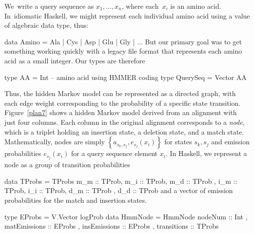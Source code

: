 \documentclass[preprint,nonatbib,blockstyle,nocopyrightspace,times]{sigplanconf}
\newcommand\figref[1]{Figure~\ref{#1}}
\newenvironment{smallverbatim}{\par\small\verbatim}{\endverbatim}
\begin{document}
We~write a query sequence as
$x_{1}, \ldots, x_{n}$, where each~$x_i$ is an amino acid.
In~idiomatic Haskell, we might represent each individual amino acid
using a value of algebraic data type, thus:
\begin{smallverbatim}
data Amino = Ala | Cys | Asp | Glu | Gly | ...
\end{smallverbatim}
But our primary goal was to get something working quickly with a
legacy file format that represents each amino acid as a small integer.
Our types are therefore
\begin{smallverbatim}
type AA       = Int -- amino acid using HMMER coding
type QuerySeq = Vector AA
\end{smallverbatim}




Thus, the hidden Markov model can be represented as a directed graph, with each
edge weight corresponding to the probability of a specific state transition.
\figref{plan7} shows a hidden Markov model derived from an alignment
with just four columns.
Each column in the original alignment corresponds to a \emph{node},
which is a triplet holding an insertion state, a deletion state, and a
match state.
Mathematically, nodes are simply $\left\{a_{s_{k},s_{j}}, e_{s_{j}}(x_{i})\right\}$
for states $s_{k}, s_{j}$ and emission probabilities $e_{s_{j}}(x_{i})$ for a
query sequence element $x_{i}$.
In Haskell, we represent a node as a group of transition probabilities
\begin{smallverbatim}
data TProbs = 
     TProbs { m_m :: TProb, m_i :: TProb, m_d :: TProb
            , i_m :: TProb, i_i :: TProb, d_m :: TProb
            , d_d :: TProb}
\end{smallverbatim}
and a vector of emission probabilities for the match and insertion states.
\begin{smallverbatim}
type EProbs = V.Vector logProb
data HmmNode = HmmNode { nodeNum :: Int
                       , matEmissions :: EProbs
                       , insEmissions :: EProbs
                       , transitions :: TProbs
                       }
\end{smallverbatim}
\end{document}
